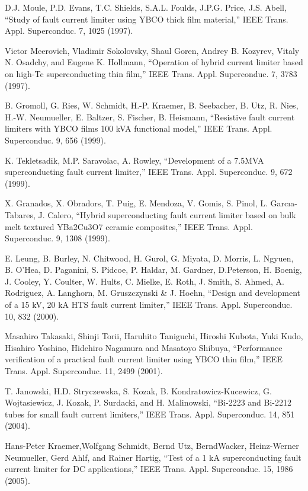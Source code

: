 \noindent [9.122] D.J. Moule, P.D. Evans, T.C. Shields, S.A.L. Foulds, J.P.G. Price, J.S. Abell,
``Study of fault current limiter using YBCO thick film material,” IEEE Trans.
Appl. Superconduc. 7, 1025 (1997).

\noindent [9.123] Victor Meerovich, Vladimir Sokolovsky, Shaul Goren, Andrey B. Kozyrev, Vitaly
N. Osadchy, and Eugene K. Hollmann, ``Operation of hybrid current limiter based
on high-Tc superconducting thin film,” IEEE Trans. Appl. Superconduc. 7, 3783
(1997).

\noindent [9.124] B. Gromoll, G. Ries, W. Schmidt, H.-P. Kraemer, B. Seebacher, B. Utz, R. Nies,
H.-W. Neumueller, E. Baltzer, S. Fischer, B. Heismann, ``Resistive fault current
limiters with YBCO films 100 kVA functional model,” IEEE Trans. Appl. Superconduc.
9, 656 (1999).

\noindent [9.125] K. Tekletsadik, M.P. Saravolac, A. Rowley, ``Development of a 7.5MVA superconducting
fault current limiter,” IEEE Trans. Appl. Superconduc. 9, 672 (1999).

\noindent [9.126] X. Granados, X. Obradors, T. Puig, E. Mendoza, V. Gomis, S. Pinol, L. Garcıa-Tabares, J. Calero, ``Hybrid superconducting fault current limiter based on bulk melt textured YBa2Cu3O7 ceramic composites,” IEEE Trans. Appl. Superconduc.
9, 1308 (1999).

\noindent [9.127] E. Leung, B. Burley, N. Chitwood, H. Gurol, G. Miyata, D. Morris, L. Ngyuen,
B. O’Hea, D. Paganini, S. Pidcoe, P. Haldar, M. Gardner, D.Peterson, H. Boenig,
J. Cooley, Y. Coulter, W. Hults, C. Mielke, E. Roth, J. Smith, S. Ahmed, A. Rodriguez,
A. Langhorn, M. Gruszczynski \& J. Hoehn, ``Design and development of
a 15 kV, 20 kA HTS fault current limiter,” IEEE Trans. Appl. Superconduc. 10,
832 (2000).

\noindent [9.128] Masahiro Takasaki, Shinji Torii, Haruhito Taniguchi, Hiroshi Kubota, Yuki Kudo,
Hisahiro Yoshino, Hidehiro Nagamura and Masatoyo Shibuya, ``Performance verification
of a practical fault current limiter using YBCO thin film,” IEEE Trans.
Appl. Superconduc. 11, 2499 (2001).

\noindent [9.129] T. Janowski, H.D. Stryczewska, S. Kozak, B. Kondratowicz-Kucewicz, G. Wojtasiewicz,
J. Kozak, P. Surdacki, and H. Malinowski, ``Bi-2223 and Bi-2212 tubes
for small fault current limiters,” IEEE Trans. Appl. Superconduc. 14, 851 (2004).

\noindent [9.130] Hans-Peter Kraemer,Wolfgang Schmidt, Bernd Utz, BerndWacker, Heinz-Werner
Neumueller, Gerd Ahlf, and Rainer Hartig, ``Test of a 1 kA superconducting fault
current limiter for DC applications,” IEEE Trans. Appl. Superconduc. 15, 1986
(2005).

